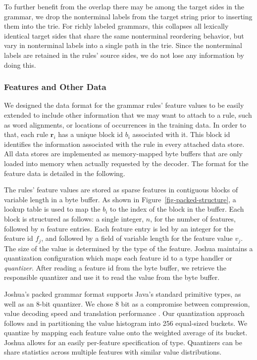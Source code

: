 \documentclass[11pt]{article}
\begin{document}
To further benefit from the overlap there may be among the target
sides in the grammar, we drop the nonterminal labels from the target
string prior to inserting them into the trie. For richly labeled
grammars, this collapses all lexically identical target sides that
share the same nonterminal reordering behavior, but vary in
nonterminal labels into a single path in the trie. Since the
nonterminal labels are retained in the rules' source sides, we do not
lose any information by doing this.


\subsubsection{Features and Other Data}

We designed the data format for the grammar rules' feature values to
be easily extended to include other information that we may want to
attach to a rule, such as word alignments, or locations of occurrences
in the training data. In order to that, each rule $\mathbf{r}_i$ has a
unique block id $b_i$ associated with it. This block id identifies the
information associated with the rule in every attached data store. All
data stores are implemented as memory-mapped byte buffers that are
only loaded into memory when actually requested by the decoder. The
format for the feature data is detailed in the following.

The rules' feature values are stored as sparse features in contiguous
blocks of variable length in a byte buffer. As shown in
Figure~\ref{fig-packed-structure}, a lookup table is used to map the
$b_i$ to the index of the block in the buffer. Each block is
structured as follows: a single integer, $n$, for the number of
features, followed by $n$ feature entries. Each feature entry is led
by an integer for the feature id $f_j$, and followed by a field of
variable length for the feature value $v_j$. The size of the value is
determined by the type of the feature. Joshua maintains a quantization
configuration which maps each feature id to a type handler or
\emph{quantizer}. After reading a feature id from the byte buffer, we
retrieve the responsible quantizer and use it to read the value from
the byte buffer.

Joshua's packed grammar format supports Java's standard primitive
types, as well as an 8-bit quantizer. We chose 8 bit as a compromise
between compression, value decoding speed and translation performance
\cite{Federico2006}. Our quantization approach follows
 and  in partitioning the value
histogram into 256 equal-sized buckets. We quantize by mapping each
feature value onto the weighted average of its bucket. Joshua allows
for an easily per-feature specification of type. Quantizers can be
share statistics across multiple features with similar value
distributions.
\end{document}
